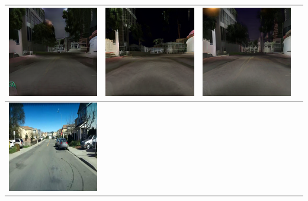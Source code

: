 \documentclass{VUMIFPSbakalaurinis}
\begin{document}
\begin{table}[H]
{\begin{tabular}{|c|c|c|c|}
            \includegraphics[scale=0.35]{img/pvz/1_cycle} & \includegraphics[scale=0.35]{img/pvz/1_cut} & \includegraphics[scale=0.35]{img/pvz/1_mspc}
            \\
            \hline
            \includegraphics[scale=0.35]{img/pvz/3_real} & 

\end{tabular}}
\end{table}
\end{document}
